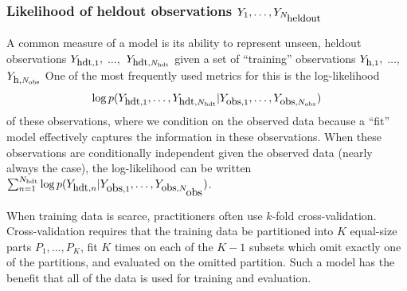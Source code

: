 


\subsubsection{Likelihood of heldout observations $Y_1, \ldots,
  Y_{N_{\mbox{\small heldout}}}$}
A common measure of a model is its ability to represent
unseen, heldout observations $Y_{\mbox{\small hdt},1},$ $\ldots,$
$Y_{\mbox{\small hdt},N_{\mbox{\tiny hdt}}}$ given a set of ``training''
  observations $Y_{\mbox{\small h},1},$ $\ldots,$ $Y_{\mbox{\small
      h},N_{\mbox{\tiny obs}}}$ One of the most frequently used metrics
    for this is the log-likelihood
\begin{align*}
  \log
  p(Y_{\mbox{\small hdt},1}, \ldots, Y_{\mbox{\small hdt},N_{\mbox{\tiny hdt}}}
  | Y_{\mbox{\small obs},1}, \ldots, Y_{\mbox{\small obs}, N_{\mbox{\tiny obs}}})
\end{align*}
of these observations, where we condition on the observed data because
a ``fit'' model effectively captures the information in these
observations.  When these observations are conditionally independent
given the observed data (nearly always the case), the log-likelihood
can be written $\sum_{n=1}^{N_{\mbox{\tiny hdt}}} \log
p(Y_{\mbox{\small hdt},n} | Y_{\mbox{obs},1}, \ldots, Y_{\mbox{\small
    obs},N_{\mbox{obs}}})$.

When training data is scarce, practitioners often use $k$-fold
cross-validation.  Cross-validation requires that the training data be
partitioned into $K$ equal-size parts $P_1, \ldots, P_K$, fit $K$
times on each of the $K - 1$ subsets which omit exactly one of the
partitions, and evaluated on the omitted partition.  Such a model has
the benefit that all of the data is used for training and evaluation.

